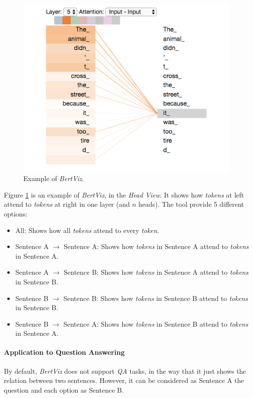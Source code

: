 \paragraph{}
\begin{figure}
	\centering
	\includegraphics[scale=0.55]{images/selfattention}
	\caption{Example of \emph{BertViz}.}
	\label{fig:bertviz-ex}
\end{figure}
Figure \ref{fig:bertviz-ex} is an example of \emph{BertViz}, in the \emph{Head View}. It shows how \emph{tokens} at left attend to \emph{tokens} at right in one layer (and $n$ heads). The tool provide 5 different options:
\begin{itemize}
	\item All: Shows how all \emph{tokens} attend to every \emph{token}.
	\item Sentence A $\rightarrow$ Sentence A: Shows how \emph{tokens} in Sentence A attend to \emph{tokens} in Sentence A.
	\item Sentence A $\rightarrow$ Sentence B: Shows how \emph{tokens} in Sentence A attend to \emph{tokens} in Sentence B.
	\item Sentence B $\rightarrow$ Sentence B: Shows how \emph{tokens} in Sentence B attend to \emph{tokens} in Sentence B.
	\item Sentence B $\rightarrow$ Sentence A: Shows how \emph{tokens} in Sentence B attend to \emph{tokens} in Sentence A.
\end{itemize}
\paragraph{Application to Question Answering}
By default, \emph{BertViz} does not support \emph{QA} tasks, in the way that it just shows the relation between two sentences. However, it can be considered as Sentence A the question and each option as Sentence B. 
